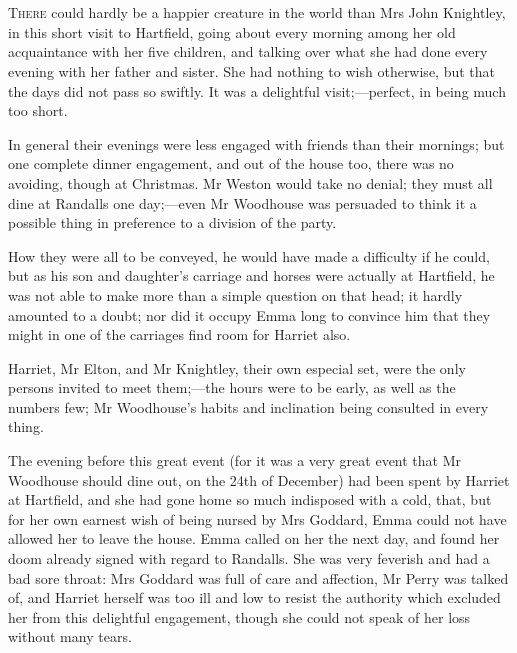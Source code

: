 \chapter[Chapter \thechapter]{}
\lettrine[lraise=0.3]{T}{here} could hardly be a happier creature in the world than Mrs John Knightley, in this short visit to Hartfield, going about every morning among her old acquaintance with her five children, and talking over what she had done every evening with her father and sister. She had nothing to wish otherwise, but that the days did not pass so swiftly. It was a delightful visit;—perfect, in being much too short.

In general their evenings were less engaged with friends than their mornings; but one complete dinner engagement, and out of the house too, there was no avoiding, though at Christmas. Mr Weston would take no denial; they must all dine at Randalls one day;—even Mr Woodhouse was persuaded to think it a possible thing in preference to a division of the party.

How they were all to be conveyed, he would have made a difficulty if he could, but as his son and daughter's carriage and horses were actually at Hartfield, he was not able to make more than a simple question on that head; it hardly amounted to a doubt; nor did it occupy Emma long to convince him that they might in one of the carriages find room for Harriet also.

Harriet, Mr Elton, and Mr Knightley, their own especial set, were the only persons invited to meet them;—the hours were to be early, as well as the numbers few; Mr Woodhouse's habits and inclination being consulted in every thing.

The evening before this great event (for it was a very great event that Mr Woodhouse should dine out, on the 24th of December) had been spent by Harriet at Hartfield, and she had gone home so much indisposed with a cold, that, but for her own earnest wish of being nursed by Mrs Goddard, Emma could not have allowed her to leave the house. Emma called on her the next day, and found her doom already signed with regard to Randalls. She was very feverish and had a bad sore throat: Mrs Goddard was full of care and affection, Mr Perry was talked of, and Harriet herself was too ill and low to resist the authority which excluded her from this delightful engagement, though she could not speak of her loss without many tears.

